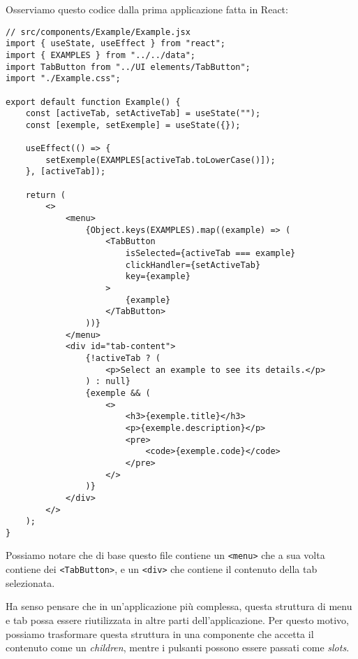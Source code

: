 \documentclass[12pt]{article}
\begin{document}
Osserviamo questo codice dalla prima applicazione fatta in React:
\begin{verbatim}
// src/components/Example/Example.jsx
import { useState, useEffect } from "react";
import { EXAMPLES } from "../../data";
import TabButton from "../UI elements/TabButton";
import "./Example.css";

export default function Example() {
    const [activeTab, setActiveTab] = useState("");
    const [exemple, setExemple] = useState({});

    useEffect(() => {
        setExemple(EXAMPLES[activeTab.toLowerCase()]);
    }, [activeTab]);

    return (
        <>
            <menu>
                {Object.keys(EXAMPLES).map((example) => (
                    <TabButton
                        isSelected={activeTab === example}
                        clickHandler={setActiveTab}
                        key={example}
                    >
                        {example}
                    </TabButton>
                ))}
            </menu>
            <div id="tab-content">
                {!activeTab ? (
                    <p>Select an example to see its details.</p>
                ) : null}
                {exemple && (
                    <>
                        <h3>{exemple.title}</h3>
                        <p>{exemple.description}</p>
                        <pre>
                            <code>{exemple.code}</code>
                        </pre>
                    </>
                )}
            </div>
        </>
    );
}
\end{verbatim}

Possiamo notare che di base questo file contiene un \texttt{<menu>} 
che a sua volta contiene dei \texttt{<TabButton>}, e un \texttt{<div>}
che contiene il contenuto della tab selezionata.

Ha senso pensare che in un'applicazione più complessa, questa struttura
di menu e tab possa essere riutilizzata in altre parti dell'applicazione.
Per questo motivo, possiamo trasformare questa struttura in una componente
che accetta il contenuto come un {\it children}, mentre i pulsanti
possono essere passati come {\it slots}.
\end{document}
